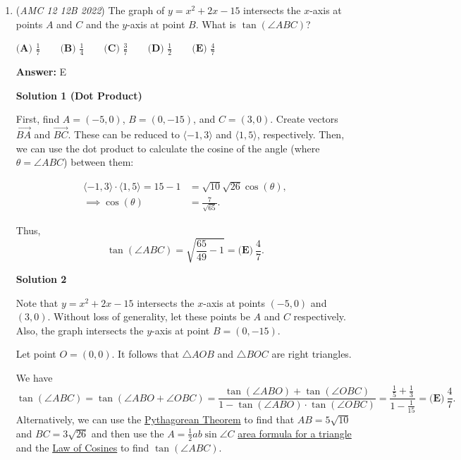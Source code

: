 \begin{enumerate}
 $HG = A'H \cdot \frac{3}{4} = \frac{15}{4}$.

 
            \begin{enumerate}[label=(\roman*)]
                <dt>then, finally, $[A'CEG] = [A'CEH] - [\triangle GA'H] = 5^2 - \frac{1}{2} \cdot \frac{15}{4} \cdot 5 = \boxed{\textbf{(D) }15\dfrac{5}{8}}.$</dt>
            \end{enumerate}
            


	\item (\textit{AMC 12 12B 2022}) The graph of $y=x^2+2x-15$ intersects the $x$-axis at points $A$ and $C$ and the $y$-axis at point $B$. What is $\tan(\angle ABC)$?


 $\textbf{(A) }\frac{1}{7} \qquad \textbf{(B) }\frac{1}{4} \qquad \textbf{(C) }\frac{3}{7} \qquad \textbf{(D) }\frac{1}{2} \qquad \textbf{(E) }\frac{4}{7}$

 \textbf{Answer: }E



\textbf{Solution 1 (Dot Product)}

First, find $A=(-5,0)$, $B=(0,-15)$, and $C=(3,0)$. Create vectors $\overrightarrow{BA}$ and $\overrightarrow{BC}.$ These can be reduced to $\langle -1, 3 \rangle$ and $\langle 1, 5 \rangle$, respectively. Then, we can use the dot product to calculate the cosine of the angle (where $\theta=\angle ABC$) between them:

 
 \begin{align*} \langle -1, 3 \rangle \cdot \langle 1, 5 \rangle = 15-1 &= \sqrt{10}\sqrt{26}\cos(\theta),\\ \implies \cos (\theta) &= \frac{7}{\sqrt{65}}. \end{align*}


 Thus, 
 \[\tan(\angle ABC) = \sqrt{\frac{65}{49}-1}= \boxed{\textbf{(E)}\ \frac{4}{7}}.\]




\textbf{Solution 2}

Note that $y=x^2+2x-15$ intersects the $x$-axis at points $(-5, 0)$ and $(3, 0)$. Without loss of generality, let these points be $A$ and $C$ respectively. Also, the graph intersects the $y$-axis at point $B = (0, -15)$.

 Let point $O=(0, 0)$. It follows that $\triangle AOB$ and $\triangle BOC$ are right triangles. 

 We have 
 \[\tan(\angle ABC) = \tan(\angle ABO + \angle OBC) = \frac{\tan(\angle ABO) + \tan(\angle OBC)}{1 - \tan(\angle ABO) \cdot \tan(\angle OBC)} = \frac{\frac15 + \frac13}{1 - \frac1{15}} = \boxed{\textbf{(E)}\ \frac{4}{7}}.\] Alternatively, we can use the \href{https://artofproblemsolving.com/wiki/index.php?title=Pythagorean\_Theorem}{Pythagorean Theorem} to find that $AB = 5 \sqrt{10}$ and $BC = 3 \sqrt{26}$ and then use the $A = \frac12 ab \sin \angle C$ \href{https://artofproblemsolving.com/wiki/index.php?title=Area\_of\_a\_Triangle}{area formula for a triangle} and the \href{https://artofproblemsolving.com/wiki/index.php?title=Law\_of\_Cosines}{Law of Cosines} to find $\tan(\angle ABC)$.


\end{enumerate}
